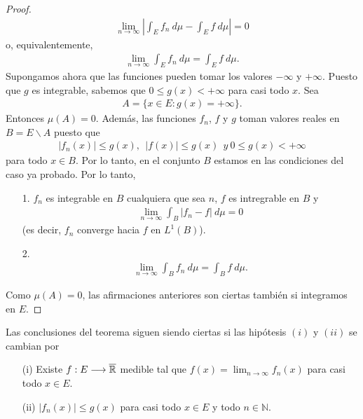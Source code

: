 \begin{proof}
\begin{align*}
    \lim_{n \to \infty}{ \left| \int_{E}{f_n \ d\mu} - \int_{E}{f \ d\mu}\right|} = 0
\end{align*}
o, equivalentemente,
\begin{align*}
    \lim_{n \to \infty}{\int_{E}{f_n \ d\mu}} = {\int_{E}{f \ d\mu}}.
\end{align*}
Supongamos ahora que las funciones pueden tomar los valores $-\infty$ y $+\infty$. Puesto que $g$ es integrable, sabemos que $0 \leq g(x) < +\infty$ para casi todo $x$. Sea
\begin{align*}
    A = \{ x \in E : g(x) = +\infty \}.
\end{align*}
Entonces $\mu(A) = 0$. Además, las funciones $f_n$, $f$ y $g$ toman valores reales en $B = E \backslash A$ puesto que
\begin{align*}
    |f_n(x)| \leq g(x), \ \ |f(x)| \leq g(x) \ \ y \ 0 \leq g(x) < +\infty
\end{align*}
para todo $x \in B$. Por lo tanto, en el conjunto $B$ estamos en las condiciones del caso ya probado. Por lo tanto,
\begin{enumerate}
    \item[1.] $f_n$ es integrable en $B$ cualquiera que sea $n$, $f$ es intregrable en $B$ y
    \begin{align*}
        \lim_{n \to \infty}{\int_{B}{|f_n - f| \ d\mu}} = 0
    \end{align*}
    (es decir, $f_n$ converge hacia $f$ en $L^1(B)$).
    \item[2.] 
    \begin{align*}
         \lim_{n \to \infty}{\int_{B}{f_n \ d\mu}} = {\int_{B}{f \ d\mu}}.
    \end{align*}
\end{enumerate}
Como $\mu(A) = 0$, las afirmaciones anteriores son ciertas también si integramos en $E$.
\end{proof}

\begin{obs}
Las conclusiones del teorema siguen siendo ciertas si las hipótesis $(i)$ y $(ii)$ se cambian por
\begin{enumerate}
     \item[(i)] Existe $f: E \longrightarrow \overline{\mathbb{R}}$ medible tal que $f(x) = \lim_{n \to \infty}{f_n(x)}$ para casi todo $x \in E$.
    \item[(ii)] $|f_n(x)| \leq g(x)$ para casi todo $x \in E$ y todo $n \in \mathbb{N}$.
\end{enumerate}
\end{obs}

